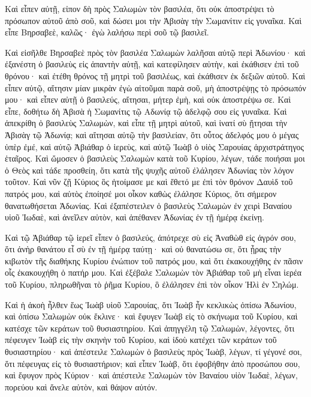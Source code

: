 {Καὶ εἶπεν αὐτῇ, εἰπον δὴ πρὸς Σαλωμὼν τὸν βασιλέα, ὅτι οὐκ ἀποστρέψει τὸ πρόσωπον αὐτοῦ ἀπὸ σοῦ, καὶ δώσει μοι τὴν Ἀβισὰγ τὴν Σωμανίτιν εἰς γυναῖκα.
Καὶ εἶπε Βηρσαβεὲ, καλῶς· ἐγὼ λαλήσω περὶ σοῦ τῷ βασιλεῖ.
\par }{\PP {}Καὶ εἰσῆλθε Βηρσαβεὲ πρὸς τὸν βασιλέα Σαλωμὼν λαλῆσαι αὐτῷ περὶ Ἀδωνίου· καὶ ἐξανέστη ὁ βασιλεὺς εἰς ἀπαντὴν αὐτῇ, καὶ κατεφίλησεν αὐτὴν, καὶ ἐκάθισεν ἐπὶ τοῦ θρόνου· καὶ ἐτέθη θρόνος τῇ μητρὶ τοῦ βασιλέως, καὶ ἐκάθισεν ἐκ δεξιῶν αὐτοῦ.
Καὶ εἶπεν αὐτῷ, αἴτησιν μίαν μικρὰν ἐγὼ αἰτοῦμαι παρὰ σοῦ, μὴ ἀποστρέψῃς τὸ πρόσωπόν μου· καὶ εἶπεν αὐτῇ ὁ βασιλεύς, αἴτησαι, μήτερ ἐμὴ, καὶ οὐκ ἀποστρέψω σε.
Καὶ εἶπε, δοθήτω δὴ Ἀβισὰ ἡ Σωμανίτις τῷ Αδωνίᾳ τῷ ἀδελφῷ σου εἰς γυναῖκα.
Καὶ ἀπεκρίθη ὁ βασιλεὺς Σαλωμὼν, καὶ εἶπε τῇ μητρὶ αὐτοῦ, καὶ ἱνατί σὺ ᾔτησαι τὴν Ἀβισὰγ τῷ Ἀδωνίᾳ; καὶ αἴτησαι αὐτῷ τὴν βασιλείαν, ὅτι οὗτος ἀδελφός μου ὁ μέγας ὑπὲρ ἐμέ, καὶ αὐτῷ Ἀβιάθαρ ὁ ἱερεὺς, καὶ αὐτῷ Ἰωὰβ ὁ υἱὸς Σαρουίας ἀρχιστράτηγος ἑταῖρος.
Καὶ ὤμοσεν ὁ βασιλεὺς Σαλωμὼν κατὰ τοῦ Κυρίου, λέγων, τάδε ποιήσαι μοι ὁ Θεὸς καὶ τάδε προσθείη, ὅτι κατὰ τῆς ψυχῆς αὐτοῦ ἐλάλησεν Ἀδωνίας τὸν λόγον τοῦτον.
Καὶ νῦν ζῇ Κύριος ὃς ἡτοίμασε με καὶ ἔθετό με ἐπὶ τὸν θρόνον Δαυὶδ τοῦ πατρός μου, καὶ αὐτὸς ἐποίησέ μοι οἶκον καθὼς ἐλάλησε Κύριος, ὅτι σήμερον θανατωθήσεται Ἀδωνίας.
Καὶ ἐξαπέστειλεν ὁ βασιλεὺς Σαλωμὼν ἐν χειρὶ Βαναίου υἱοῦ Ἰωδαὲ, καὶ ἀνεῖλεν αὐτὸν, καὶ ἀπέθανεν Ἀδωνίας ἐν τῇ ἡμέρᾳ ἐκείνῃ.
\par }{\PP {}Καὶ τῷ Ἀβιάθαρ τῷ ἱερεῖ εἶπεν ὁ βασιλεύς, ἀπότρεχε σὺ εἰς Ἀναθὼθ εἰς ἀγρόν σου, ὅτι ἀνὴρ θανάτου εἶ σὺ ἐν τῇ ἡμέρᾳ ταύτῃ· καὶ οὐ θανατώσω σε, ὅτι ᾖρας τὴν κιβωτὸν τῆς διαθήκης Κυρίου ἐνώπιον τοῦ πατρός μου, καὶ ὅτι ἐκακουχήθης ἐν πᾶσιν οἷς ἐκακουχήθη ὁ πατήρ μου.
Καὶ ἐξέβαλε Σαλωμὼν τὸν Ἀβιάθαρ τοῦ μὴ εἶναι ἱερέα τοῦ Κυρίου, πληρωθῆναι τὸ ῥῆμα Κυρίου, ὃ ἐλάλησεν ἐπὶ τὸν οἶκον Ἡλὶ ἐν Σηλώμ.
\par }{\PP {}Καὶ ἡ ἀκοὴ ἦλθεν ἕως Ἰωὰβ υἱοῦ Σαρουίας, ὅτι Ἰωὰβ ἦν κεκλικὼς ὀπίσω Ἀδωνίου, καὶ ὀπίσω Σαλωμὼν οὐκ ἔκλινε· καὶ ἔφυγεν Ἰωὰβ εἰς τὸ σκήνωμα τοῦ Κυρίου, καὶ κατέσχε τῶν κεράτων τοῦ θυσιαστηρίου.
Καὶ ἀπηγγέλη τῷ Σαλωμὼν, λέγοντες, ὅτι πέφευγεν Ἰωὰβ εἰς τὴν σκηνὴν τοῦ Κυρίου, καὶ ἰδοὺ κατέχει τῶν κεράτων τοῦ θυσιαστηρίου· καὶ ἀπέστειλε Σαλωμὼν ὁ βασιλεὺς πρὸς Ἰωὰβ, λέγων, τί γέγονέ σοι, ὅτι πέφευγας εἰς τὸ θυσιαστήριον; καὶ εἶπεν Ἰωὰβ, ὅτι ἐφοβήθην ἀπὸ προσώπου σου, καὶ ἔφυγον πρὸς Κύριον· καὶ ἀπέστειλε Σαλωμὼν τὸν Βαναίου υἱὸν Ἰωδαὲ, λέγων, πορεύου καὶ ἄνελε αὐτὸν, καὶ θάψον αὐτόν.
}
